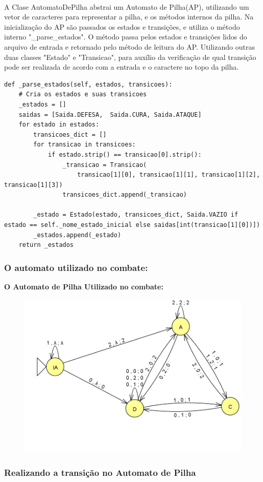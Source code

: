 \documentclass[12pt]{article}
\begin{document}
\paragraph{}A Clase AutomatoDePilha abstrai um Automato de Pilha(AP), utilizando um vetor de caracteres para representar a pilha, e os métodos internos da pilha. Na inicialização do AP são passados os estados e transições, e utiliza o método interno "\_parse\_estados".
O método passa pelos estados e transições lidos do arquivo de entrada e retornado pelo método de leitura do AP.  Utilizando outras duas classes "Estado" e "Transicao",  para auxílio da verificação de qual transição pode ser realizada de acordo com a entrada e o caractere no topo da pilha.
\begin{verbatim}
def _parse_estados(self, estados, transicoes):
    # Cria os estados e suas transicoes
    _estados = []
    saidas = [Saida.DEFESA,  Saida.CURA, Saida.ATAQUE]
    for estado in estados:
        transicoes_dict = []
        for transicao in transicoes:
            if estado.strip() == transicao[0].strip():
                _transicao = Transicao(
                    transicao[1][0], transicao[1][1], transicao[1][2], transicao[1][3])
                transicoes_dict.append(_transicao)

        _estado = Estado(estado, transicoes_dict, Saida.VAZIO if estado == self._nome_estado_inicial else saidas[int(transicao[1][0])])
        _estados.append(_estado)
    return _estados
\end{verbatim}
\subsubsection{O automato utilizado no combate:}
\textbf{O Automato de Pilha Utilizado no combate:}
\begin{figure}[!h]
  \centering
  \includegraphics[width=0.5\linewidth]{Ap1.png}
\end{figure}
\newpage
\subsubsection{Realizando a transição no Automato de Pilha}
\end{document}
